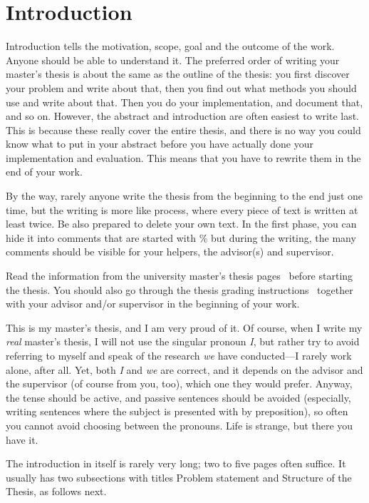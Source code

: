 \chapter{Introduction}
\label{chapter:intro}


Introduction tells the motivation, scope, goal and the outcome of the
work. Anyone should be able to understand it. The preferred order of
writing your master's thesis is about the same as the outline of the
thesis: you first discover your problem and write about that, then you
find out what methods you should use and write about that.  Then you
do your implementation, and document that, and so on.  However, the
abstract and introduction are often easiest to write last.  This is
because these really cover the entire thesis, and there is no way you
could know what to put in your abstract before you have actually done
your implementation and evaluation. This means that you have to
rewrite them in the end of your work.

By the way, rarely anyone write the thesis from the beginning to the
end just one time, but the writing is more like process, where every
piece of text is written at least twice. Be also prepared to delete
your own text. In the first phase, you can hide it into comments that
are started with \% but during the writing, the many comments should
be visible for your helpers, the advisor(s) and supervisor.

Read the information from the university master's thesis
pages~\cite{ThesisInstructions} before starting the thesis.  You
should also go through the thesis grading
instructions~\cite{ThesisGrading} together with your advisor and/or
supervisor in the beginning of your work.

This is my master's thesis, and I am very proud of it.  Of course,
when I write my \emph{real} master's thesis, I will not use the
singular pronoun \emph{I}, but rather try to avoid referring to myself
and speak of the research \emph{we} have conducted---I rarely work
alone, after all.  Yet, both \emph{I} and \emph{we} are correct, and
it depends on the advisor and the supervisor (of course from you,
too), which one they would prefer. Anyway, the tense should be active,
and passive sentences should be avoided (especially, writing sentences
where the subject is presented with by preposition), so often you
cannot avoid choosing between the pronouns. Life is strange, but there
you have it.

The introduction in itself is rarely very long; two to five pages
often suffice. It usually has two subsections with titles Problem
statement and Structure of the Thesis, as follows next.


